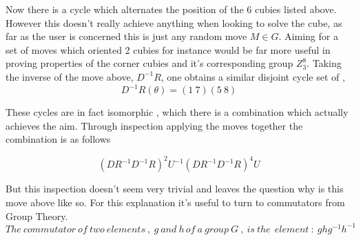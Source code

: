 \documentclass{article}
\begin{document}
Now there is a cycle which alternates the position of the 6 cubies listed above. However this doesn't really achieve anything when looking to solve the cube, as far as the user is concerned this is just any random move $M \in G$. Aiming for a set of moves which oriented 2 cubies for instance would be far more useful in proving properties of the corner cubies and it's corresponding group $Z_{3}^{8}$. Taking the inverse of the move above, $D^{-1}R$, one obtains a similar disjoint cycle set of , 
\begin{equation}
D^{-1}R(\theta) = (1\ 7)(5\ 8)
\end{equation}


These cycles are in fact isomorphic , which there is a combination which actually achieves the aim. Through inspection applying the moves together the combination is as follows

\begin{equation}
(DR^{-1}D^{-1}R)^{2}  U^{-1}  (DR^{-1}D^{-1}R)^{4} U
\end{equation}
\vspace{-20pt}
\begin{figure}[h]
\centering
\begin{minipage}{3cm}%
%
\end{minipage}%
\end{figure}
\vspace{20pt}


But this inspection doesn't seem very trivial and leaves the question why is this move above like so. For this explanation it's useful to turn to commutators from Group Theory. 
\begin{equation}
The\ commutator\ of\ two\ elements\ ,\ g\ and\ h\, of\ a\ group\ G\ ,\ is\ the\ \ element\ :\ ghg^{-1}h^{-1}
\end{equation}
\end{document}
